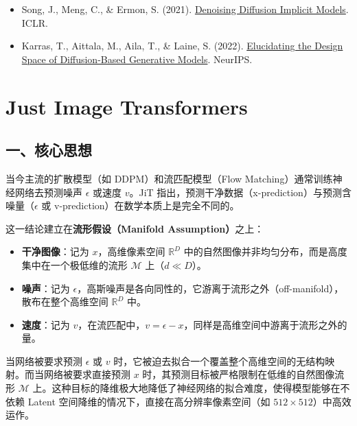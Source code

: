 \vspace{0.25em}
\begin{itemize}
\tightlist
\item
  Song, J., Meng, C., \& Ermon, S. (2021). \href{https://arxiv.org/abs/2010.02502}{Denoising Diffusion Implicit Models}. ICLR.
\item
  Karras, T., Aittala, M., Aila, T., \& Laine, S. (2022). \href{https://arxiv.org/abs/2206.00364}{Elucidating the Design Space of Diffusion-Based Generative Models}. NeurIPS.
\end{itemize}

\clearpage

\hypertarget{just-image-transformers}{%
\section{Just Image Transformers}\label{just-image-transformers}}

\hypertarget{ux4e00ux6838ux5fc3ux601dux60f3-11}{%
\subsection{一、核心思想}\label{ux4e00ux6838ux5fc3ux601dux60f3-11}}

当今主流的扩散模型（如 DDPM）和流匹配模型（Flow Matching）通常训练神经网络去预测噪声 \(\epsilon\) 或速度 \(v\)。JiT 指出，预测干净数据（x-prediction）与预测含噪量（\(\epsilon\) 或 v-prediction）在数学本质上是完全不同的。

这一结论建立在\textbf{流形假设（Manifold Assumption）}之上：

\begin{itemize}
\tightlist
\item
  \textbf{干净图像}：记为 \(x\)，高维像素空间 \(\mathbb{R}^D\) 中的自然图像并非均匀分布，而是高度集中在一个极低维的流形 \(\mathcal{M}\) 上（\(d\ll D\)）。
\item
  \textbf{噪声}：记为 \(\epsilon\)，高斯噪声是各向同性的，它游离于流形之外（off-manifold），散布在整个高维空间 \(\mathbb{R}^D\) 中。
\item
  \textbf{速度}：记为 \(v\)，在流匹配中，\(v=\epsilon-x\)，同样是高维空间中游离于流形之外的量。
\end{itemize}

当网络被要求预测 \(\epsilon\) 或 \(v\) 时，它被迫去拟合一个覆盖整个高维空间的无结构映射。而当网络被要求直接预测 \(x\) 时，其预测目标被严格限制在低维的自然图像流形 \(\mathcal{M}\) 上。这种目标的降维极大地降低了神经网络的拟合难度，使得模型能够在不依赖 Latent 空间降维的情况下，直接在高分辨率像素空间（如 \(512\times512\)）中高效运作。

